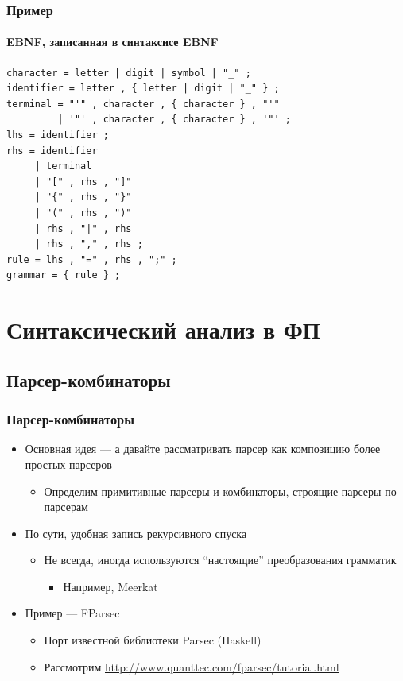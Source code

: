 \documentclass{../../slides-style}
\begin{document}
    \begin{frame}[fragile]
        \frametitle{Пример}
        \framesubtitle{EBNF, записанная в синтаксисе EBNF}
        \begin{footnotesize}
            \begin{verbatim}
character = letter | digit | symbol | "_" ;
identifier = letter , { letter | digit | "_" } ;
terminal = "'" , character , { character } , "'" 
         | '"' , character , { character } , '"' ;
lhs = identifier ;
rhs = identifier
     | terminal
     | "[" , rhs , "]"
     | "{" , rhs , "}"
     | "(" , rhs , ")"
     | rhs , "|" , rhs
     | rhs , "," , rhs ;
rule = lhs , "=" , rhs , ";" ;
grammar = { rule } ;
            \end{verbatim}
        \end{footnotesize}
    \end{frame}

    \section{Синтаксический анализ в ФП}

    \subsection{Парсер-комбинаторы}

    \begin{frame}
        \frametitle{Парсер-комбинаторы}
        \begin{itemize}
            \item Основная идея --- а давайте рассматривать парсер как композицию более простых парсеров
            \begin{itemize}
                \item Определим примитивные парсеры и комбинаторы, строящие парсеры по парсерам
            \end{itemize}
            \item По сути, удобная запись рекурсивного спуска
            \begin{itemize}
                \item Не всегда, иногда используются ``настоящие'' преобразования грамматик
                \begin{itemize}
                    \item Например, Meerkat
                \end{itemize}
            \end{itemize}
            \item Пример --- FParsec
            \begin{itemize}
                \item Порт известной библиотеки Parsec (Haskell)
                \item Рассмотрим \url{http://www.quanttec.com/fparsec/tutorial.html}
            \end{itemize}
        \end{itemize}
    \end{frame}
\end{document}
